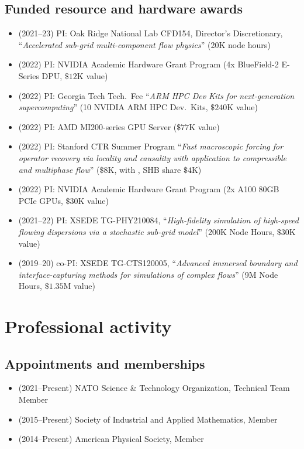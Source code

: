 \subsection{Funded resource and hardware awards}

\begin{itemize}
    \item (2021--23) PI: Oak Ridge National Lab CFD154, Director's Discretionary, ``\textit{Accelerated sub-grid multi-component flow physics}'' (20K node hours)
    \item (2022) PI: NVIDIA Academic Hardware Grant Program (4x BlueField-2 E-Series DPU, $\$12$K value)
    \item (2022) PI: Georgia Tech Tech.\ Fee ``\textit{ARM HPC Dev Kits for next-generation supercomputing}'' (10 NVIDIA ARM HPC Dev.\ Kits, $\$240$K value)
    \item (2022) PI: AMD MI200-series GPU Server ($\$77$K value)
    \item (2022) PI: Stanford CTR Summer Program ``\textit{Fast macroscopic forcing for operator recovery via locality and causality with application to compressible and multiphase flow}'' ($\$8$K, with \Florian, SHB share $\$4$K)
    \item (2022) PI: NVIDIA Academic Hardware Grant Program (2x A100 80GB PCIe GPUs, $\$30$K value)
    \item (2021--22) PI: XSEDE TG-PHY210084, ``\textit{High-fidelity simulation of high-speed flowing dispersions via a stochastic sub-grid model}''  (200K Node Hours, $\$30$K value)
    \item (2019--20) co-PI: XSEDE TG-CTS120005, ``\textit{Advanced immersed boundary and interface-capturing methods for simulations of complex flows}'' (9M Node Hours, $\$1.35$M value)
\end{itemize}

% 

\section{Professional activity}

\subsection{Appointments and memberships}

\begin{itemize}
    \item (2021--Present) NATO Science \& Technology Organization, Technical Team Member
    \item (2015--Present) Society of Industrial and Applied Mathematics, Member
    \item (2014--Present) American Physical Society, Member
\end{itemize}

